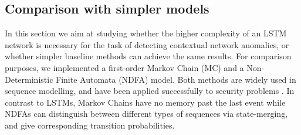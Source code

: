 \subsection{Comparison with simpler models}\label{Sect:Compsimp}

In this section we aim at studying whether the higher complexity of an LSTM network is necessary for the task of detecting contextual network anomalies, or whether simpler baseline methods can achieve the same results. For comparison purposes, we implemented a first-order Markov Chain (MC) and a Non-Deterministic Finite  Automata (NDFA) model. Both methods are widely used in sequence modelling, and have been applied successfully to security problems \cite{ye2000markov,Pellegrino2017}. In contrast to LSTMs, Markov Chains have no memory past the last event while NDFAs can distinguish between different types of sequences via state-merging, and give corresponding transition probabilities.

